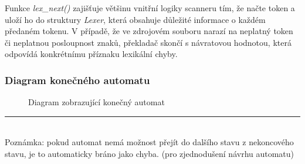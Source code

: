 \documentclass[a4paper, 12pt]{article} %
\begin{document}
            Funkce \textit{lex\_next()} zajišťuje většinu vnitřní logiky scanneru tím, že načte 
            token a uloží ho do struktury \textit{Lexer}, která obsahuje důležité informace o každém 
            předaném tokenu. V případě, že ve zdrojovém souboru narazí na neplatný token či neplatnou
            posloupnost znaků, překladač skončí s návratovou hodnotou, která odpovídá konkrétnímu 
            příznaku lexikální chyby. 


            \newpage
            \subsubsection{Diagram konečného automatu} \label{kodiagram}
                \begin{figure}[H]
                    \centering
                    \caption{Diagram zobrazující konečný automat}
                \end{figure}

                \rule{5cm}{0.4pt} \\
                {\footnotesize Poznámka: pokud automat nemá možnost přejít do dalšího stavu z 
                nekoncového stavu, je to automaticky bráno jako chyba. (pro zjednodušení návrhu
                automatu)}
            \newpage
\end{document}
